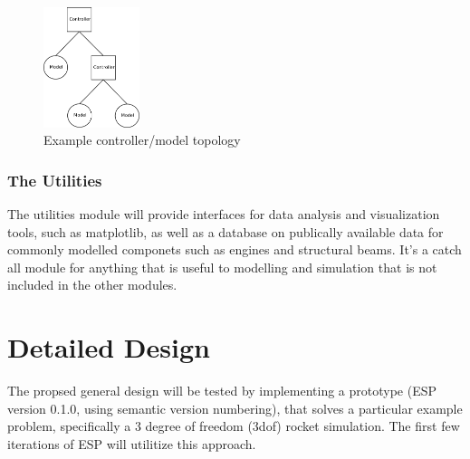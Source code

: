 \documentclass{book}
\begin{document}
\begin{figure}[h]
\centering
\leavevmode
\includegraphics[width=0.25\textwidth]{example_controller_layout.pdf}
\caption{Example controller/model topology}
\label{example_controller_model_topology}
\end{figure}

\subsection{The Utilities}
The utilities module will provide interfaces for data analysis and visualization tools, such as matplotlib, as well as a database on publically available data for commonly modelled componets such as engines and structural beams. It's a catch all module for anything that is useful to modelling and simulation that is not included in the other modules.

\chapter{Detailed Design}
The propsed general design will be tested by implementing a prototype (ESP version 0.1.0, using semantic version numbering), that solves a particular example problem, specifically a 3 degree of freedom (3dof) rocket simulation. The first few iterations of ESP will utilitize this approach.
\end{document}
